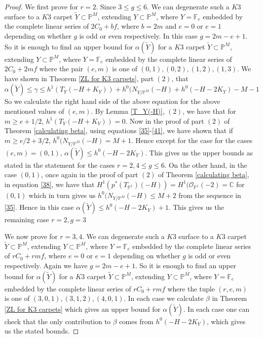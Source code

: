 \documentclass[11pt,twoside]{amsart}
\theoremstyle{plain}
\numberwithin{equation}{section}
\theoremstyle{definition}
\begin{document}
\begin{proof}
We first prove for $r = 2$. Since $3 \leq g \leq 6$. We can degenerate such a $K3$ surface to a $K3$ carpet $\widetilde{Y} \subset \mathbb{P}^M$, extending $Y \subset \mathbb{P}^M$, where $Y = \mathbb{F}_e$ embedded by the complete linear series of $2C_0+bf$, where $b = 2m$ and $e = 0$ or $e = 1$ depending on whether $g$ is odd or even respectively. In this case $g = 2m-e+1$. So it is enough to find an upper bound for $\alpha(\widetilde{Y})$ for a $K3$ carpet $\widetilde{Y} \subset \mathbb{P}^M$, extending $Y \subset \mathbb{P}^M$, where $Y = \mathbb{F}_e$ embedded by the complete linear series of $2C_0+2mf$ where the pair $(e,m)$ is one of $(0,1), (0,2), (1,2), (1,3)$. We have shown in Theorem \ref{ZL for K3 carpets}, part $(2)$, that $$\alpha(\widetilde{Y})  \leq  \gamma \leq h^1(T_Y(-H+K_Y))+h^0(N_{Y/\mathbb{P}^M}(-H)+h^0(-H-2K_Y)-M-1 $$
So we calculate the right hand side of the above equation for the above mentioned values of $(e,m)$. By Lemma \ref{T_Y(-H)}, $(2)$, we have that for $m \geq e+1/2$, $h^1(T_Y(-H+K_Y)) = 0$. Now in the proof of part $(2)$ of Theorem \ref{calculating beta}, using equations \ref{35}-\ref{41}, we have shown that if $m \geq e/2+3/2$, $h^0(N_{Y/\mathbb{P}^M}(-H) = M+1$. Hence except for the case for the cases $(e,m) = (0,1)$, $\alpha(\widetilde{Y}) \leq h^0(-H-2K_Y)$. This gives us the upper bounds as stated in the statement for the cases $r = 2, 4 \leq g \leq 6$. On the other hand, in the case $(0,1)$, once again in the proof of part $(2)$ of Theorem \ref{calculating beta}, in equation \ref{38}, we have that $H^1(p^*(T_{\mathbb{P}^1})(-H)) = H^1(\mathcal{O}_{\mathbb{P}^1}(-2) = \mathbb{C}$ for $(0,1)$ 
which in turn gives us $h^0(N_{Y/\mathbb{P}^M}(-H) \leq M+2$ 
from the sequence in \ref{35}. Hence in this case $\alpha(\widetilde{Y}) \leq h^0(-H-2K_Y)+1$.
This gives us the remaining case $r = 2, g = 3$ 

We now prove for $r = 3,4$. We can degenerate such a $K3$ surface to a $K3$ carpet $\widetilde{Y} \subset \mathbb{P}^M$, extending $Y \subset \mathbb{P}^M$, where $Y = \mathbb{F}_e$ embedded by the complete linear series of $rC_0+rmf$, where $e = 0$ or $e = 1$ depending on whether $g$ is odd or even respectively. Again we have $g = 2m-e+1$. So it is enough to find an upper bound for $\alpha(\widetilde{Y})$ for a $K3$ carpet $\widetilde{Y} \subset \mathbb{P}^M$, extending $Y \subset \mathbb{P}^M$, where $Y = \mathbb{F}_e$ embedded by the complete linear series of $rC_0+rmf$ where the tuple $(r,e,m)$ is one of $(3,0,1), (3,1,2), (4,0,1)$. In each case we calculate $\beta$ in Theorem \ref{ZL for K3 carpets} which gives an upper bound for $\alpha(\widetilde{Y})$. In each case 
one can check that the only contribution to $\beta$ comes from $h^0(-H-2K_Y)$, which gives us the stated bounds. 
\end{proof}
\end{document}
